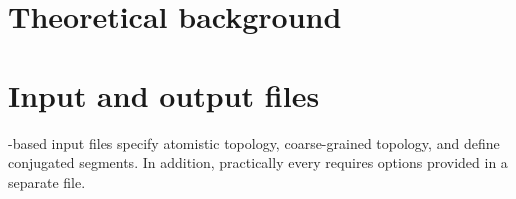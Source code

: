 \documentclass[a4paper,10pt]{book}
\begin{document}
\addtolength{\oddsidemargin}{0cm}
\addtolength{\evensidemargin}{0cm}
\addtolength{\textwidth}{0cm}
\addtolength{\topmargin}{0cm}
\addtolength{\textheight}{0cm}




\frontmatter

\thispagestyle{empty}
\cleardoublepage

\tableofcontents
\mainmatter

\printindex
\linenumbers



\chapter{Theoretical background}
\label{sec:theory}










%



\chapter{Input and output files}
\label{sec:io}

\xml-based input files specify atomistic topology, coarse-grained topology, and define conjugated segments. In addition, practically every \calculator requires options provided in a separate \xml file.










\appendix
%


\nolinenumbers



\end{document}

